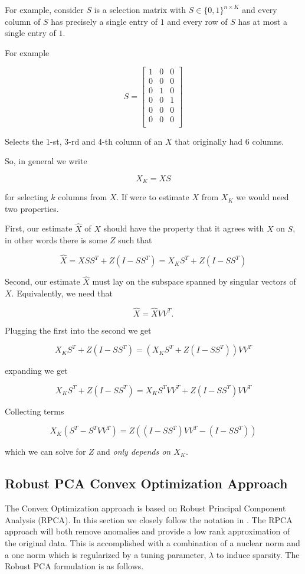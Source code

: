 \documentclass[conference]{IEEEtran}
\begin{document}
For example, consider $S$ is a selection matrix with $S \in \{0,1\}^{n \times K}$ and every column of $S$ has precisely a single entry of $1$ and every row of $S$ has at most a single entry of $1$.

For example

$$
S = 
\begin{bmatrix}
1 & 0 & 0 \\
0 & 0 & 0 \\
0 & 1 & 0 \\
0 & 0 & 1 \\
0 & 0 & 0 \\
0 & 0 & 0 \\
\end{bmatrix}
$$

Selects the $1$-st, $3$-rd and $4$-th column of an $X$ that originally had $6$ columns.

So, in general we write 

$$X_K = X S$$

for selecting $k$ columns from $X$.
If were to estimate $X$ from $X_K$ we would need two properties.

First, our estimate $\hat{X}$ of $X$ should have the property that it agrees with $X$ on $S$, in other words there is some $Z$ such that

$$
\hat{X} = X S S^T + Z (I-S S^T) = X_K S^T + Z (I-S S^T)
$$

Second, our estimate $\hat{X}$ must lay on the subspace spanned by singular vectors of $X$.  Equivalently, we need that

$$
\hat{X} = \hat{X} V V^T.
$$

Plugging the first into the second we get

$$
X_K S^T + Z (I-S S^T) = (X_K S^T + Z (I-S S^T)) V V^T 
$$

expanding we get 

$$
X_K S^T + Z (I-S S^T) = X_K S^T V V^T + Z (I-S S^T)V V^T
$$

Collecting terms

$$
X_K (S^T - S^T V V^T) = Z ((I-S S^T)V V^T - (I-S S^T))
$$

which we can solve for $Z$ and \emph{only depends on $X_K$}.

\subsection{Robust PCA Convex Optimization Approach}
The Convex Optimization approach is based on Robust Principal Component Analysis (RPCA). In this section we closely follow the notation in \cite{Paffenroth2012a,Paffenroth2013b,paffenroth2018robust}. The RPCA approach will both remove anomalies and provide a low rank approximation of the original data. This is accomplished with a combination of a nuclear norm and a one norm which is regularized by a tuning parameter, $\lambda$ to induce sparsity. The Robust PCA formulation is as follows.
\end{document}
